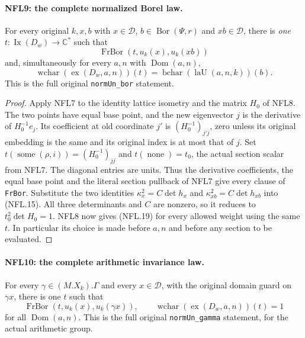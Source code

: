 \documentclass[11pt,a4paper]{article}
\numberwithin{equation}{section}
\theoremstyle{remark}\newtheorem{remark}[theorem]{Remark}
\begin{document}
\paragraph{NFL9: the complete normalized Borel law.}
\label{claim:NFL9}
For every original $k,x,b$ with $x\in\mathcal D$,
$b\in\operatorname{Bor}(\Psi,r)$ and $xb\in\mathcal D$, there is
\emph{one} $t:\operatorname{Ix}(D_w)\to\mathbb C^*$ such that
\[
 \operatorname{FrBor}(t,u_k(x),u_k(xb))
\]
and, simultaneously for every $a,n$ with $\operatorname{Dom}(a,n)$,
\[
 \operatorname{wchar}(\operatorname{ex}(D_w,a,n))(t)
      =\operatorname{bchar}(\operatorname{laU}(a,n,k))(b).
 \tag{NFL.19}
\]
This is the full original \texttt{norm\allowbreak Un\_\allowbreak bor} statement.

\begin{proof}
Apply NFL7 to the identity lattice isometry and the matrix $H_0$
of NFL8.  The two points have equal base point, and the new
eigenvector $j$ is the derivative of $H_0^{-1}e_j$.
Its coefficient at old coordinate $j'$ is
$(H_0^{-1})_{j'j}$, zero unless its original embedding is the
same and its original index is at most that of $j$.
Set $t(\operatorname{some}(\rho,i))=(H_0^{-1})_{jj}$ and
$t(\operatorname{none})=t_0$, the actual section scalar from NFL7.
The diagonal entries are units.  Thus the derivative coefficients,
the equal base point and the literal section pullback of NFL7
give every clause of \texttt{Fr\allowbreak Bor}.
Substitute the two identities $\kappa_x^2=C\det h_x$ and
$\kappa_{xb}^2=C\det h_{xb}$ into (NFL.15).
All three determinants and $C$ are nonzero, so it reduces to
$t_0^2\det H_0=1$.  NFL8 now gives (NFL.19) for every allowed
weight using the same $t$.  In particular its choice is made
before $a,n$ and before any section to be evaluated.
\end{proof}

\paragraph{NFL10: the complete arithmetic invariance law.}
\label{claim:NFL10}
For every $\gamma\in(M.X_k).\Gamma$ and every $x\in\mathcal D$,
with the original domain guard on $\gamma x$, there is one $t$
such that
\[
 \operatorname{FrBor}(t,u_k(x),u_k(\gamma x)),\qquad
 \operatorname{wchar}(\operatorname{ex}(D_w,a,n))(t)=1
 \tag{NFL.20}
\]
for all $\operatorname{Dom}(a,n)$.  This is the full original
\texttt{norm\allowbreak Un\_\allowbreak gamma} statement, for the actual arithmetic group.
\end{document}
